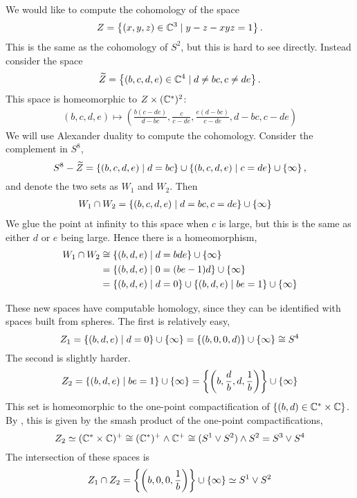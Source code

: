 \begin{example}
  We would like to compute the cohomology of the space 
  \[ Z = \left\{  (x,y,z)\in\mathbb{C}^3 \mid y-z -xyz = 1 \right\}. \]
  This is the same as the cohomology of $S^2$, but this is hard to see
  directly. Instead consider the space
  \[ \widetilde Z = \left\{ (b,c,d,e) \in \mathbb{C}^4 \mid d\neq
    bc, c\neq de \right\}. \]
  This space is homeomorphic to $Z\times (\mathbb{C}^*)^2$:
  \begin{align*}
    (b,c,d,e) \mapsto \left(
    \frac{b(c-de)}{d-bc}, \frac{c}{c-de}, \frac{e(d-bc)}{c-de},
    d-bc, c-de\right)
  \end{align*}
  We will use Alexander duality to compute the cohomology. Consider
  the complement in $S^8$,
  \[ S^8-\widetilde Z = \left\{ (b,c,d,e) \mid d = bc \right\} \cup \left\{ (b,c,d,e)
    \mid c = de \right\} \cup \left\{ \infty \right\}, \]
  and denote the two sets as $W_1$ and $W_2$. Then
  \begin{align*}
    W_1\cap W_2 &= \left\{ (b,c,d,e) \mid d=bc,c=de \right\}\cup\left\{ \infty \right\}
  \end{align*}
  We glue the point at infinity to this space when $c$ is large, but
  this is the same as either $d$ or $e$ being large. Hence there is a
  homeomorphism,
  \begin{align*}
    W_1\cap W_2 &\cong \left\{ (b,d,e) \mid d=bde \right\}\cup\left\{ \infty \right\} \\
                &= \left\{ (b,d,e)\mid 0 = (be-1)d \right\}\cup\left\{ \infty \right\} \\
                &= \left\{ (b,d,e) \mid d = 0 \right\} \cup \left\{ (b,d,e) \mid
                  be=1 \right\}\cup\left\{ \infty \right\}
  \end{align*}
  
  These new spaces have computable homology, since they can be
  identified with spaces built from spheres. The first is relatively
  easy,
  \[ Z_1 = \left\{ (b,d,e)\mid d = 0 \right\}\cup \left\{ \infty \right\} =
  \left\{ (b,0,0,d) \right\}\cup\left\{ \infty \right\} \cong S^4 \]
  The second is slightly harder.
  \[ Z_2 =\left\{ (b,d,e)\mid be=1 \right\}\cup\left\{ \infty \right\}=
  \left\{ \left(b,\frac{d}{b},d,\frac{1}{b} \right)  \right\}\cup\left\{ \infty \right\} \]
  This set is homeomorphic to the one-point compactification of
  $\left\{ (b,d)\in \mathbb{C}^*\times \mathbb{C} \right\}$. By \cite[Chapter~2.3]{dupontk}, this
  is given by the smash product of the one-point compactifications,
  \[ Z_2\simeq (\mathbb{C}^*\times\mathbb{C})^+ \cong (\mathbb{C}^*)^+\wedge\mathbb{C}^+ \cong (S^1\vee
  S^2) \wedge S^2 = S^3 \vee S^4 \]
  The intersection of these spaces is
  \[ Z_1\cap Z_2 = \left\{ \left(b,0,0,\frac{1}{b}\right) \right\}\cup\left\{ \infty \right\}
  \simeq S^1\vee S^2 \]
  

\end{example}
